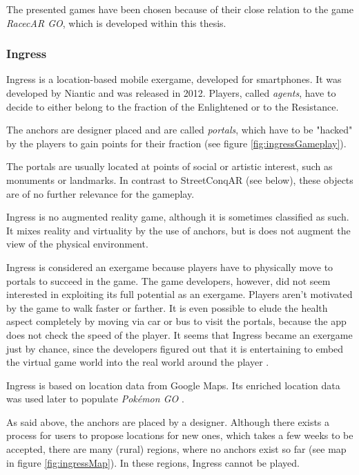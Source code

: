 The presented games have been chosen because of their close relation to the game \emph{RacecAR GO}, which is developed within this thesis.

\subsubsection{Ingress}
Ingress is a location-based mobile exergame, developed for smartphones. It was developed by Niantic and was released in 2012. Players, called \emph{agents}, have to decide to either belong to the fraction of the Enlightened or to the Resistance.

The anchors are designer placed and are called \emph{portals}, which have to be "hacked" by the players to gain points for their fraction (see figure \ref{fig:ingressGameplay}).

The portals are usually located at points of social or artistic interest, such as monuments or landmarks. In contrast to StreetConqAR (see below), these objects are of no further relevance for the gameplay.

Ingress is no augmented reality game, although it is sometimes classified as such. It mixes reality and virtuality by the use of anchors, but is does not augment the view of the physical environment.

Ingress is considered an exergame because players have to physically move to portals to succeed in the game. The game developers, however, did not seem interested in exploiting its full potential as an exergame. Players aren't motivated by the game to walk faster or farther. It is even possible to elude the health aspect completely by moving via car or bus to visit the portals, because the app does not check the speed of the player. It seems that Ingress became an exergame just by chance, since the developers figured out that it is entertaining to embed the virtual game world into the real world around the player \citep{knoll2014urban}.

Ingress is based on location data from Google Maps. Its enriched location data was used later to populate \emph{Pok\'{e}mon GO} \citep{Ingress}.

As said above, the anchors are placed by a designer. Although there exists a process for users to propose locations for new ones, which takes a few weeks to be accepted, there are many (rural) regions, where no anchors exist so far (see map in figure \ref{fig:ingressMap}). In these regions, Ingress cannot be played.

